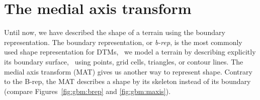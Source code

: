 
\graphicspath{{mat/}}
\label{chap:mat}

\chapter{The medial axis transform}

Until now, we have described the shape of a terrain using the boundary representation. 
The boundary representation, or \emph{b-rep}, is the most commonly used shape representation for DTMs, \ie\ we model a terrain by describing explicitly its boundary surface, \eg\ using points, grid cells, triangles, or contour lines.
The medial axis transform (MAT) gives us another way to represent shape.
Contrary to the B-rep, the MAT describes a shape by its skeleton instead of its boundary (compare Figures~\ref{fig:gbm:brep} and \ref{fig:gbm:maxis}).
